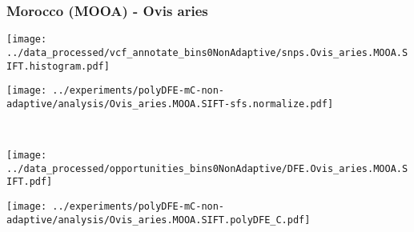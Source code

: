 \subsubsection{Morocco (MOOA) - Ovis aries}

\begin{minipage}{0.49\linewidth}
    \texttt{[image: ../data\_processed/vcf\_annotate\_bins0NonAdaptive/snps.Ovis\_aries.MOOA.SIFT.histogram.pdf]}
\end{minipage}
\begin{minipage}{0.49\linewidth}
    \texttt{[image: ../experiments/polyDFE-mC-non-adaptive/analysis/Ovis\_aries.MOOA.SIFT-sfs.normalize.pdf]}
\end{minipage}
\\
\begin{minipage}{0.49\linewidth}
    \texttt{[image: ../data\_processed/opportunities\_bins0NonAdaptive/DFE.Ovis\_aries.MOOA.SIFT.pdf]}
\end{minipage}
\begin{minipage}{0.49\linewidth}
    \texttt{[image: ../experiments/polyDFE-mC-non-adaptive/analysis/Ovis\_aries.MOOA.SIFT.polyDFE\_C.pdf]}
\end{minipage}
\\ 

